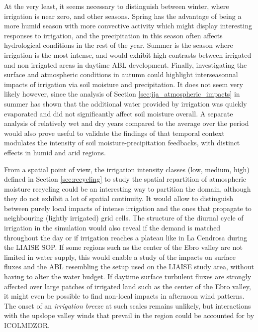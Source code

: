 At the very least, it seems necessary to distinguish between winter, where irrigation is near zero, and other seasons. Spring has the advantage of being a more humid season with more convective activity which might display interesting responses to irrigation, and the precipitation in this season often affects hydrological conditions in the rest of the year. 
Summer is the season where irrigation is the most intense, and would exhibit high contrasts between irrigated and non irrigated areas in daytime ABL development.
Finally, investigating the surface and atmospheric conditions in autumn could highlight interseasonnal impacts of irrigation via soil moisture and precipitation. It does not seem very likely however, since the analysis of Section \ref{sec:jja_atmospheric_impacts} in summer has shown that the additional water provided by irrigation was quickly evaporated and did not significantly affect soil moisture overall.
A separate analysis of relatively wet and dry years compared to the average over the period would also prove useful to validate the findings of \citet{zou_precipitation_2023,zhang_us_2025} that temporal context modulates the intensity of soil moisture-precipitation feedbacks, with distinct effects in humid and arid regions.

From a spatial point of view, the irrigation intensity classes (low, medium, high) defined in Section \ref{sec:recycling} to study the spatial repartition of atmospheric moisture recycling could be an interesting way to partition the domain, although they do not exhibit a lot of spatial continuity.
It would allow to distinguish between purely local impacts of intense irrigation and the ones that propagate to neighbouring (lightly irrigated) grid cells.
The structure of the diurnal cycle of irrigation in the \irr simulation would also reveal if the demand is matched throughout the day or if irrigation reaches a plateau like in La Cendrosa during the LIAISE SOP. 
If some regions such as the center of the Ebro valley are not limited in water supply, this would enable a study of the impacts on surface fluxes and the ABL resembling the \irrboost setup used on the LIAISE study area, without having to alter the water budget.
If daytime surface turbulent fluxes are strongly affected over large patches of irrigated land such as the center of the Ebro valley, it might even be possible to find non-local impacts in afternoon wind patterns. The onset of an \textit{irrigation breeze} at such scales remains unlikely, but interactions with the upslope valley winds that prevail in the region \citep[which were observed in the GRAINEX campaign in the USA,][]{phillips_influence_2022} could be accounted for by ICOLMDZOR.

